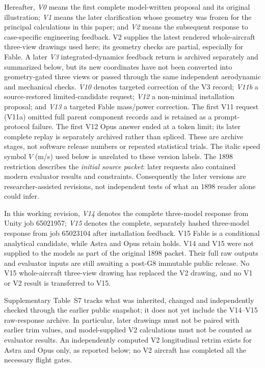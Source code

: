 \documentclass[10pt,letterpaper]{article}
\begin{document}
Hereafter, \emph{V0} means the first complete model-written proposal and its original illustration; \emph{V1} means the later clarification whose geometry was frozen for the principal calculations in this paper; and \emph{V2} means the subsequent response to case-specific engineering feedback. V2 supplies the latest rendered whole-aircraft three-view drawings used here; its geometry checks are partial, especially for Fable. A later \emph{V3} integrated-dynamics feedback return is archived separately and summarized below, but its new coordinates have not been converted into geometry-gated three views or passed through the same independent aerodynamic and mechanical checks. \emph{V10} denotes targeted correction of the V3 record; \emph{V11b} a source-restored limited-candidate request; \emph{V12} a non-minimal installation proposal; and \emph{V13} a targeted Fable mass/power correction. The first V11 request (V11a) omitted full parent component records and is retained as a prompt-protocol failure. The first V12 Opus answer ended at a token limit; its later complete replay is separately archived rather than spliced. These are archive stages, not software release numbers or repeated statistical trials. The italic speed symbol $V$ (m/s) used below is unrelated to these version labels. The 1898 restriction describes the \emph{initial source packet}: later requests also contained modern evaluator results and constraints. Consequently the later versions are researcher-assisted revisions, not independent tests of what an 1898 reader alone could infer.

In this working revision, \emph{V14} denotes the complete three-model response from Unity job 65021957; \emph{V15} denotes the complete, separately hashed three-model response from job 65023104 after installation feedback. V15 Fable is a conditional analytical candidate, while Astra and Opus retain holds. V14 and V15 were not supplied to the models as part of the original 1898 packet. Their full raw outputs and evaluator inputs are still awaiting a post-G8 immutable public release. No V15 whole-aircraft three-view drawing has replaced the V2 drawing, and no V1 or V2 result is transferred to V15.

Supplementary Table~S7 tracks what was inherited, changed and independently checked through the earlier public snapshot; it does not yet include the V14--V15 raw-response archive. In particular, later drawings must not be paired with earlier trim values, and model-supplied V2 calculations must not be counted as evaluator results. An independently computed V2 longitudinal retrim exists for Astra and Opus only, as reported below; no V2 aircraft has completed all the necessary flight gates.
\end{document}
